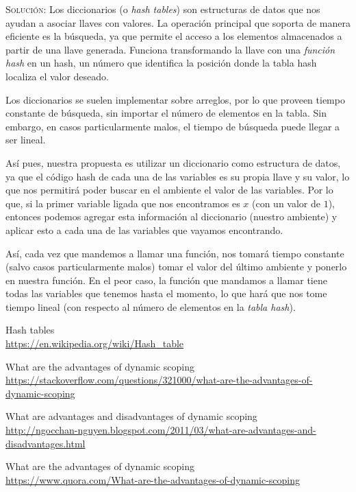 \documentclass[letterpaper,11pt]{article}
\begin{document}
\begin{enumerate}
\begin{enumerate}
        \textsc{Solución:} Los diccionarios (o \textit{hash tables}) son 
        estructuras de datos que nos ayudan a asociar llaves con valores. 
        La operación principal que soporta de manera eficiente es la 
        búsqueda, ya que permite el acceso a los elementos almacenados a partir 
        de una llave generada. Funciona transformando la llave con una 
        \textit{función hash} en un hash, un número que identifica la posición 
        donde la tabla hash localiza el valor deseado. 

        Los diccionarios se suelen implementar sobre arreglos, por lo que proveen
        tiempo constante de búsqueda, sin importar el número de elementos en la
        tabla. Sin embargo, en casos particularmente malos, el tiempo de búsqueda 
        puede llegar a ser lineal.

        Así pues, nuestra propuesta es utilizar un diccionario como estructura 
        de datos, ya que el código hash de cada una de las variables es su 
        propia llave y su valor, lo que nos permitirá poder buscar en el 
        ambiente el valor de las variables. Por lo que, si la primer variable 
        ligada que nos encontramos es $x$ (con un valor de $1$), entonces 
        podemos agregar esta información al diccionario (nuestro ambiente) y 
        aplicar esto a cada una de las variables que vayamos encontrando.

        Así, cada vez que mandemos a llamar una función, nos tomará tiempo 
        constante (salvo casos particularmente malos) tomar el valor del último 
        ambiente y ponerlo en nuestra función. En el peor caso, la función que 
        mandamos a llamar tiene todas las variables que tenemos hasta el 
        momento, lo que hará que nos tome tiempo lineal (con respecto al número 
        de elementos en la \textit{tabla hash}).
    \end{enumerate}
\end{enumerate}

\begin{thebibliography}{4}
  Hash tables \\
  \url{https://en.wikipedia.org/wiki/Hash_table}

  What are the advantages of dynamic scoping \\
  \url{https://stackoverflow.com/questions/321000/what-are-the-advantages-of-dynamic-scoping}

  What are advantages and disadvantages of dynamic scoping \\
  \url{http://ngocchan-nguyen.blogspot.com/2011/03/what-are-advantages-and-disadvantages.html}

  What are the advantages of dynamic scoping \\
  \url{https://www.quora.com/What-are-the-advantages-of-dynamic-scoping}
\end{thebibliography}
\end{document}
